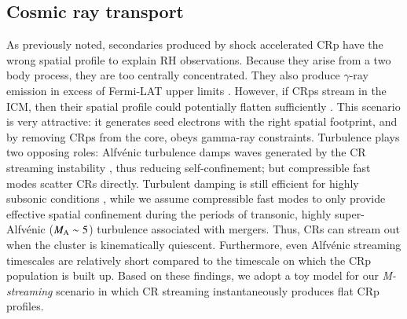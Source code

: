 \documentclass[fleqn,usenatbib,useAMS]{mnras}
\newcommand{\Mstream}{{\it M-streaming}\xspace}
\begin{document}
\subsection{Cosmic ray transport}
As previously noted, secondaries produced by shock accelerated CRp
have the wrong spatial profile to explain RH observations. Because
they arise from a two body process, they are too centrally
concentrated. They also produce $\gamma$-ray emission in excess of
Fermi-LAT upper limits
\citep{2012ApJ...757..123A,brunetti12,2014ApJ...787...18A}. However,
if CRps stream in the ICM, then their spatial profile could
potentially flatten sufficiently \citep{ensslin11,wiener13}. This
scenario is very attractive: it generates seed electrons with the
right spatial footprint, and by removing CRps from the core, obeys
gamma-ray constraints. Turbulence plays two opposing roles:
Alfv{\'e}nic turbulence damps waves generated by the CR streaming
instability \citep{yan02,farmer04}, thus reducing self-confinement;
but compressible fast modes scatter CRs directly. Turbulent damping is
still efficient for highly subsonic conditions \citep{wiener13}, while
we assume compressible fast modes to only provide effective spatial
confinement during the periods of transonic, highly super-Alfv{\'e}nic
($M_{\rm A} \sim 5$) turbulence associated with mergers. Thus, CRs can
stream out when the cluster is kinematically quiescent. Furthermore,
even Alfv{\'e}nic streaming timescales are relatively short
\cite[$\sim 0.1-0.5$ Gyr;][]{wiener13} compared to the timescale on
which the CRp population is built up. Based on these findings, we
adopt a toy model for our \Mstream scenario in which CR streaming
instantaneously produces flat CRp profiles. 
\end{document}
